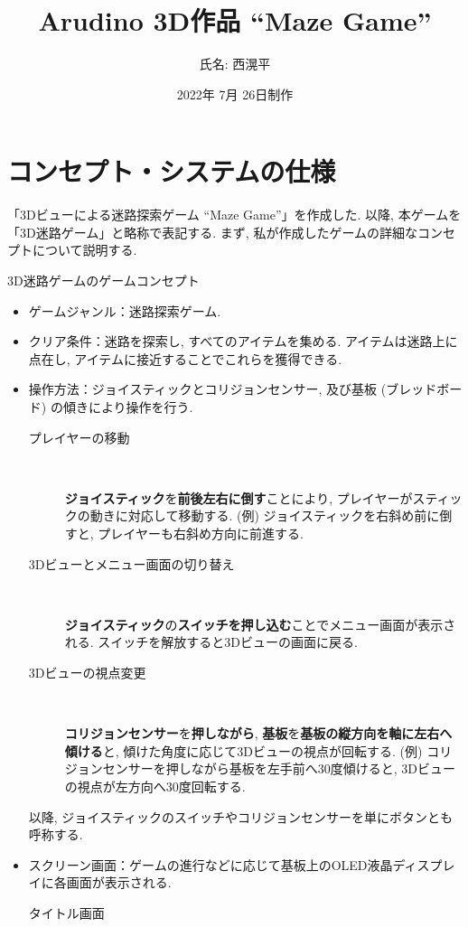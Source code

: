 \documentclass[10pt]{jsarticle}
\title{Arudino 3D作品 ``Maze Game''}
\author{氏名: 西滉平}
\date{2022年 7月 26日制作}
\begin{document}
\maketitle


\section{コンセプト・システムの仕様}

「3Dビューによる迷路探索ゲーム ``Maze Game''」を作成した.
以降, 本ゲームを「3D迷路ゲーム」と略称で表記する. 
まず, 私が作成したゲームの詳細なコンセプトについて説明する.

\begin{itembox}[l]{3D迷路ゲームのゲームコンセプト}
\begin{itemize}
	\item	ゲームジャンル：迷路探索ゲーム.
	\item	クリア条件：迷路を探索し, すべてのアイテムを集める.
			アイテムは迷路上に点在し, アイテムに接近することでこれらを獲得できる.
	\item	操作方法：ジョイスティックとコリジョンセンサー, 及び基板 (ブレッドボード) の傾きにより操作を行う.
			\begin{description}
			\item[プレイヤーの移動]  　\par
			\textbf{ジョイスティック}を\textbf{前後左右に倒す}ことにより, プレイヤーがスティックの動きに対応して移動する. 
			(例) ジョイスティックを右斜め前に倒すと, プレイヤーも右斜め方向に前進する. 
			\item[3Dビューとメニュー画面の切り替え]  　\par
			\textbf{ジョイスティック}の\textbf{スイッチを押し込む}ことでメニュー画面が表示される.
			スイッチを解放すると3Dビューの画面に戻る.
			\item[3Dビューの視点変更]  　\par
			\textbf{コリジョンセンサー}を\textbf{押しながら}, \textbf{基板}を\textbf{基板の縦方向を軸に左右へ傾ける}と, 
			傾けた角度に応じて3Dビューの視点が回転する.
			(例) コリジョンセンサーを押しながら基板を左手前へ30度傾けると, 3Dビューの視点が左方向へ30度回転する.
			\end{description}
			以降, ジョイスティックのスイッチやコリジョンセンサーを単にボタンとも呼称する.
	\item	スクリーン画面：ゲームの進行などに応じて基板上のOLED液晶ディスプレイに各画面が表示される.
			\begin{description}
			\item[タイトル画面]  　\par

\end{description}
\end{itemize}
\end{itembox}
\end{document}
